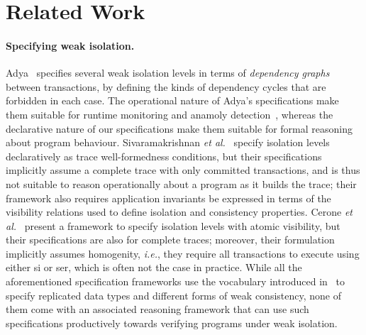 \section{Related Work}
\label{sec:relatedwork}

\paragraph{Specifying weak isolation.}
Adya~\cite{adyaphd} specifies several weak isolation levels in terms
of \emph{dependency graphs} between transactions, by defining the
kinds of dependency cycles that are forbidden in each case. The
operational nature of Adya's specifications make them suitable for
runtime monitoring and anamoly
detection~\cite{kemmevldb,feketesigmod08,pssi2011}, whereas the
declarative nature of our specifications make them suitable for formal
reasoning about program behaviour. Sivaramakrishnan \emph{et
  al.}~\cite{pldi15} specify isolation levels declaratively as trace
well-formedness conditions, but their specifications implicitly assume
a complete trace with only committed transactions, and is thus not
suitable to reason operationally about a program as it builds the
trace; their framework also requires application invariants be
expressed in terms of the visibility relations used to define
isolation and consistency properties.  Cerone \emph{et
  al.}~\cite{gotsmanconcur15} present a framework to specify isolation
levels with atomic visibility, but their specifications are also for
complete traces; moreover, their formulation implicitly assumes
homogenity, \emph{i.e.}, they require all transactions to execute
using either {\sc si} or {\sc ser}, which is often not the case in
practice. While all the aforementioned specification frameworks use
the vocabulary introduced in~\cite{burckhardt14} to specify replicated
data types and different forms of weak consistency, none of them come
with an associated reasoning framework that can use such
specifications productively towards verifying programs under weak
isolation.

